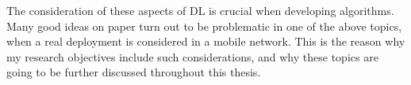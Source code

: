 			The consideration of these aspects of \ac{DL} is crucial when developing algorithms.
			Many good ideas on paper turn out to be problematic in one of the above topics, when a real deployment is considered in a mobile network.
			This is the reason why my research objectives include such considerations, and why these topics are going to be further discussed throughout this thesis.			
			
